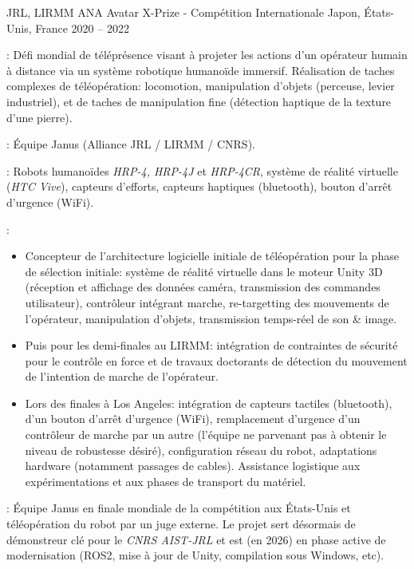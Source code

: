 \begin{cventries}
  \cventry
    {JRL, LIRMM} %
    {ANA Avatar X-Prize - Compétition Internationale} %
    {Japon, États-Unis, France} %
    {2020 -- 2022} %
    {
      \begin{cvitems} 
        \item {} : Défi mondial de téléprésence visant à projeter les actions d'un opérateur humain à distance via un système robotique humanoïde immersif. Réalisation de taches complexes de téléopération: locomotion, manipulation d'objets (perceuse, levier industriel), et de taches de manipulation fine (détection haptique de la texture d'une pierre).
        \item {} : Équipe Janus (Alliance JRL / LIRMM / CNRS).
        \item {} : Robots humanoïdes \emph{HRP-4, HRP-4J} et \emph{HRP-4CR}, système de réalité virtuelle (\emph{HTC Vive}), capteurs d'efforts, capteurs haptiques (bluetooth), bouton d'arrêt d'urgence (WiFi).
        \item {} : 
        \begin{itemize}
        \item Concepteur de l'architecture logicielle initiale de téléopération pour la phase de sélection initiale: système de réalité virtuelle dans le moteur Unity 3D (réception et affichage des données caméra, transmission des commandes utilisateur), contrôleur intégrant marche, re-targetting des mouvements de l'opérateur, manipulation d'objets, transmission temps-réel de son \& image.
        \item Puis pour les demi-finales au LIRMM: intégration de contraintes de sécurité pour le contrôle en force et de travaux doctorants de détection du mouvement de l'intention de marche de l'opérateur.
        \item Lors des finales à Los Angeles: intégration de capteurs tactiles (bluetooth), d'un bouton d'arrêt d'urgence (WiFi), remplacement d'urgence d'un contrôleur de marche par un autre (l'équipe ne parvenant pas à obtenir le niveau de robustesse désiré), configuration réseau du robot, adaptations hardware (notamment passages de cables). Assistance logistique aux expérimentations et aux phases de transport du matériel.
        \end{itemize}
        \item {} : Équipe Janus en finale mondiale de la compétition aux États-Unis et téléopération du robot par un juge externe. Le projet sert désormais de démonstreur clé pour le \emph{CNRS AIST-JRL} et est (en 2026) en phase active de modernisation (ROS2, mise à jour de Unity, compilation sous Windows, etc).
      \end{cvitems}
    }


\end{cventries}
